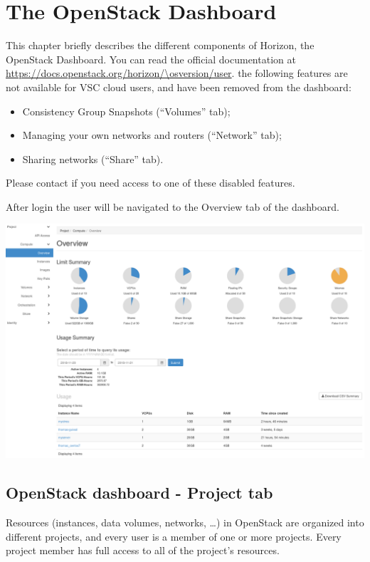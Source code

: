 \chapter{The OpenStack Dashboard}
This chapter briefly describes the different components of
\gls{Horizon}, the \gls{OpenStack Dashboard}.  You can read the
official documentation at
\url{https://docs.openstack.org/horizon/\osversion/user}.
 the following features are not available for VSC cloud
users, and have been removed from the dashboard:
\begin{itemize}
\item Consistency Group Snapshots (``Volumes'' tab);
\item Managing your own networks and routers (``Network'' tab);
\item Sharing networks (``Share'' tab).
\end{itemize}
Please contact \cloudinfo if you need access to one of these disabled
features.

After login the user will be navigated to the Overview tab of the dashboard.
\begin{center}
\includegraphics[scale=0.3]{img/tab-compute-overview.png}
\end{center}

\section*{OpenStack dashboard - Project
  tab}\label{openstack-dashboard---project-tab}
Resources (instances, data volumes, networks, \ldots) in OpenStack are
organized into different projects, and every user is a member of one
or more projects.  Every project member has full access to all of the
project's resources.

